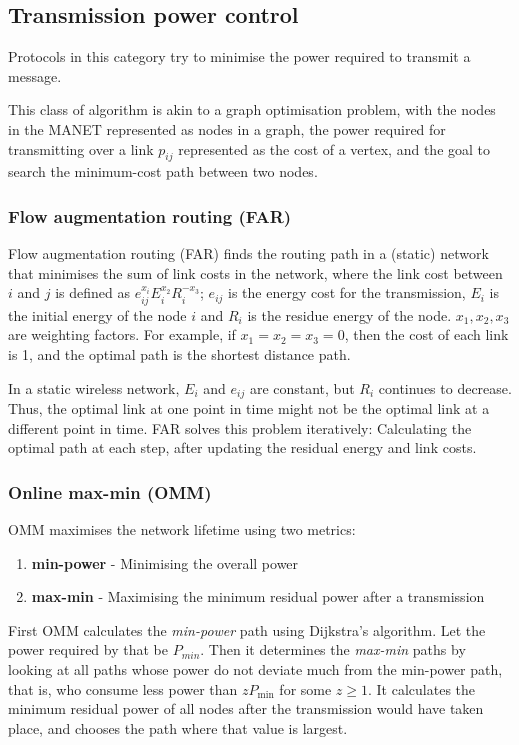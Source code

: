 \subsection{Transmission power control}
\label{power-control}
Protocols in this category try to minimise the power required to transmit
a message.

This class of algorithm is akin to a graph optimisation problem,
with the nodes in the MANET represented as nodes in a graph, the power required for
transmitting over a link $p_{ij}$ represented as the cost of a vertex, and the goal
to search the minimum-cost path between two nodes.

\subsubsection{Flow augmentation routing (FAR)}
Flow augmentation routing (FAR)\cite{chang2000energy} finds the routing
path in a (static) network that minimises the sum of link costs in the network,
where the link cost between $i$ and $j$ is defined as \( e_{ij}^{x_{i}}E_{i}^{x_{2}}R_{i}^{-x_{3}}\);
\(e_{ij}\) is the energy cost for the transmission, $E_{i}$ is the initial energy
of the node $i$ and $R_{i}$ is the residue energy of the node. \(x_{1}, x_{2}, x_{3}\)
are weighting factors. For example, if $x_{1}=x_{2}=x_{3}=0$, then the cost
of each link is 1, and the optimal path is the shortest distance path.

In a static wireless network, $E_{i}$ and $e_{ij}$ are constant, but $R_{i}$
continues to decrease. Thus, the optimal link at one point in time might not be the
optimal link at a different point in time. FAR solves this problem iteratively:
Calculating the optimal path at each step, after updating the residual energy
and link costs.

\subsubsection{Online max-min (OMM)}
\label{omm}
OMM \cite{li2001online} maximises the network lifetime using two metrics:
\begin{enumerate}
  \item \textbf{min-power} - Minimising the overall power
  \item \textbf{max-min} - Maximising the minimum residual power after a transmission
\end{enumerate}

First OMM calculates the \textit{min-power} path using Dijkstra’s algorithm. Let
the power required by that be $P_{min}$.
Then it determines the \textit{max-min} paths by looking at all paths whose
power do not deviate much from the min-power path, that is, who consume less
power than $zP_{\min}$ for some $z \ge 1$. It calculates the minimum residual power of all nodes
after the transmission would have taken place, and chooses the path where
that value is largest.

